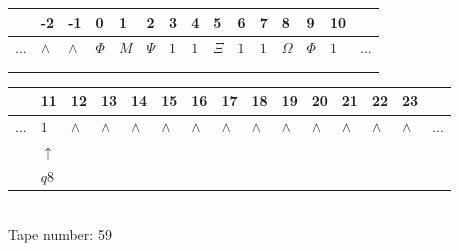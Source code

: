 \documentclass[11pt]{article}
\begin{document}
\begin{table}[H]
\centering
\begin{tabular}{lllllllllllllll}
 & -2 & -1 & 0 & 1 & 2 & 3 & 4 & 5 & 6 & 7 & 8 & 9 & 10 & \\
\hline
$...$ & \multicolumn{1}{|l|}{$\wedge$} & \multicolumn{1}{|l|}{$\wedge$} & \multicolumn{1}{|l|}{$\Phi$} & \multicolumn{1}{|l|}{$M$} & \multicolumn{1}{|l|}{$\Psi$} & \multicolumn{1}{|l|}{$1$} & \multicolumn{1}{|l|}{$1$} & \multicolumn{1}{|l|}{$\Xi$} & \multicolumn{1}{|l|}{$1$} & \multicolumn{1}{|l|}{$1$} & \multicolumn{1}{|l|}{$\Omega$} & \multicolumn{1}{|l|}{$\Phi$} & \multicolumn{1}{|l|}{$1$} & $...$\\
\hline
&  &  &  &  &  &  &  &  &  &  &  &  &  &  \\
&  &  &  &  &  &  &  &  &  &  &  &  &  &  \\
\end{tabular}
\begin{tabular}{lllllllllllllll}
 & 11 & 12 & 13 & 14 & 15 & 16 & 17 & 18 & 19 & 20 & 21 & 22 & 23 & \\
\hline
$...$ & \multicolumn{1}{|l|}{$1$} & \multicolumn{1}{|l|}{$\wedge$} & \multicolumn{1}{|l|}{$\wedge$} & \multicolumn{1}{|l|}{$\wedge$} & \multicolumn{1}{|l|}{$\wedge$} & \multicolumn{1}{|l|}{$\wedge$} & \multicolumn{1}{|l|}{$\wedge$} & \multicolumn{1}{|l|}{$\wedge$} & \multicolumn{1}{|l|}{$\wedge$} & \multicolumn{1}{|l|}{$\wedge$} & \multicolumn{1}{|l|}{$\wedge$} & \multicolumn{1}{|l|}{$\wedge$} & \multicolumn{1}{|l|}{$\wedge$} & $...$\\
\hline
& $\uparrow$ &  &  &  &  &  &  &  &  &  &  &  &  &  \\
& $ q8 $ &  &  &  &  &  &  &  &  &  &  &  &  &  \\
\end{tabular}
\\
Tape number: 59
\noindent\makebox[\linewidth]{\hdashrule{\textwidth}{1pt}{1pt}}\end{table}
\clearpage
\end{document}
